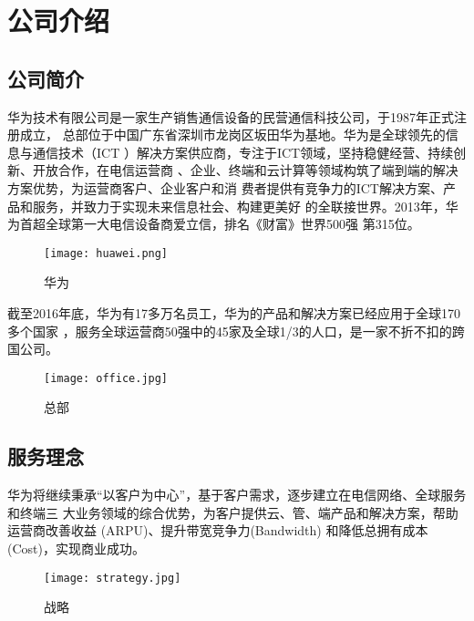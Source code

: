 \documentclass[../main]{subfiles}
\begin{document}
\chapter{公司介绍}%
\label{cha:公司介绍}

\section{公司简介}%
\label{sec:公司简介}

华为技术有限公司是一家生产销售通信设备的民营通信科技公司，于1987年正式注册成立，
总部位于中国广东省深圳市龙岗区坂田华为基地。华为是全球领先的信息与通信技术（ICT
）解决方案供应商，专注于ICT领域，坚持稳健经营、持续创新、开放合作，在电信运营商
、企业、终端和云计算等领域构筑了端到端的解决方案优势，为运营商客户、企业客户和消
费者提供有竞争力的ICT解决方案、产品和服务，并致力于实现未来信息社会、构建更美好
的全联接世界。2013年，华为首超全球第一大电信设备商爱立信，排名《财富》世界500强
第315位。

\begin{figure}[htbp]
	\centering
	\texttt{[image: huawei.png]}
	\caption{华为}
	\label{fig:华为}
\end{figure}

截至2016年底，华为有17多万名员工，华为的产品和解决方案已经应用于全球170多个国家
，服务全球运营商50强中的45家及全球1/3的人口，是一家不折不扣的跨国公司。

\newpage

\begin{figure}[htbp]
	\centering
	\texttt{[image: office.jpg]}
	\caption{总部}
	\label{fig:总部}
\end{figure}

\section{服务理念}%
\label{sec:服务理念}

华为将继续秉承“以客户为中心”，基于客户需求，逐步建立在电信网络、全球服务和终端三
大业务领域的综合优势，为客户提供云、管、端产品和解决方案，帮助运营商改善收益
(ARPU)、提升带宽竞争力(Bandwidth) 和降低总拥有成本(Cost)，实现商业成功。

\begin{figure}[htbp]
	\centering
	\texttt{[image: strategy.jpg]}
	\caption{战略}
	\label{fig:战略}
\end{figure}
\end{document}
